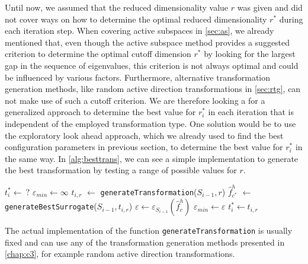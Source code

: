 \documentclass[
  a4paper,  %
  twoside,  %
  bibliography=totoc,
  headsepline,
  cleardoublepage=empty,
  parskip=half,
  draft=false
]{scrbook}
\begin{document}
Until now, we assumed that the reduced dimensionality value $r$ was given and did not cover ways on how to determine the optimal reduced dimensionality $r^\ast$ during each iteration step.
When covering active subspaces in \cref{sec:as}, we already mentioned that, even though the active subspace method provides a suggested criterion to determine the optimal cutoff dimension $r^\ast$ by looking for the largest gap in the sequence of eigenvalues, this criterion is not always optimal and could be influenced by various factors.
Furthermore, alternative transformation generation methods, like random active direction transformations in \cref{sec:rtg}, can not make use of such a cutoff criterion.
We are therefore looking a for a generalized approach to determine the best value for $r^\ast_i$ in each iteration that is independent of the employed transformation type.
One solution would be to use the exploratory look ahead approach, which we already used to find the best configuration parameters in previous section, to determine the best value for $r^\ast_i$ in the same way.
In \cref{alg:besttrans}, we can see a simple implementation to generate the best transformation by testing a range of possible values for $r$.

\begin{mdframed}[style=algstyle,frametitle={\textbf{function} \texttt{generateBestTransformation}{$(S_{i - 1}, r_{\text{min}} ,r_{\text{max}})$}}]
\normalsize
\vspace{5.5mm}
\begin{algorithmic}[1]
    \State $t_i^\ast \gets ~ ?$
    \State $\varepsilon_{min} \gets \infty$
      \State $t_{i, r}$ $\gets$ \texttt{generateTransformation}($S_{i - 1}, r$)
      \State $\hat{f}_{c^\ast}^h$ $\gets$ \texttt{generateBestSurrogate}($S_{i - 1}, t_{i, r}$)
    	\State $\varepsilon \gets \varepsilon_{S_{i - 1}}(\hat{f}_c^h)$
    	  \State $\varepsilon_{min}\gets \varepsilon$
    	\State $t_i^\ast \gets t_{i, r}$
    	\EndIf
    \EndFor
    \State {}
\end{algorithmic}
\vspace{-1.5mm}
\delimit
	\label{alg:besttrans}
\end{mdframed}
%
The actual implementation of the function \texttt{generateTransformation} is usually fixed and can use any of the transformation generation methods presented in \cref{chap:c3}, for example random active direction transformations.
\end{document}
